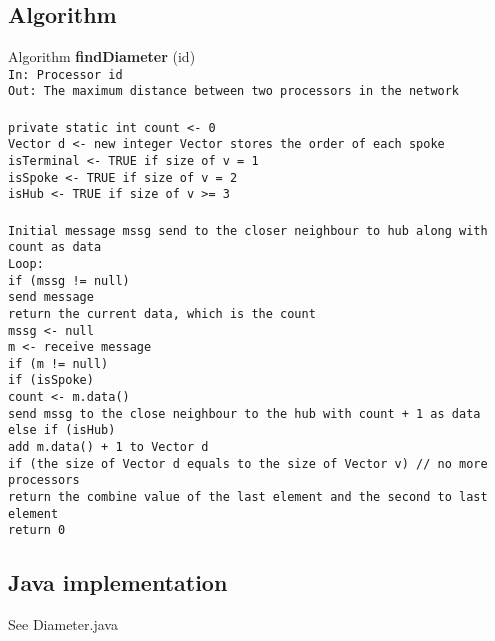 \documentclass[12pt,letterpaper]{article}
\begin{document}
\subsection* {Algorithm}
Algorithm \textbf{findDiameter} (id)\\
\texttt {In: Processor id\\
\texttt Out: The maximum distance between two processors in the network\\ \\
\texttt private static int count <- 0 \\
\texttt Vector d <- new integer Vector stores the order of each spoke \\
\texttt isTerminal <- TRUE if size of v = 1 \\
\texttt isSpoke <- TRUE if size of v = 2 \\
\texttt isHub <- TRUE if size of v >= 3 \\ \\ 
\texttt Initial message mssg send to the closer neighbour to hub along with count as data \\
\texttt Loop: \\
\texttt if (mssg != null) \\
\hphantom{~~~~} send message \\
\hphantom{~~~~} return the current data, which is the count \\
\texttt mssg <- null \\
\texttt m <- receive message \\
\texttt if (m != null) \\
\hphantom{~~~~} if (isSpoke) \\
\hphantom{~~~~~~~~} count <- m.data() \\
\hphantom{~~~~~~~~} send mssg to the close neighbour to the hub with count + 1 as data \\
\hphantom{~~~~} else if (isHub) \\
\hphantom{~~~~~~~~} add m.data() + 1 to Vector d \\
\hphantom{~~~~} if (the size of Vector d equals to the size of Vector v) // no more processors\\
\hphantom{~~~~~~~~} return the combine value of the last element and the second to last element \\
\texttt return 0} \\

\subsection* {Java implementation}
See Diameter.java
\newpage
\end{document}
